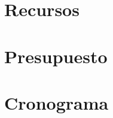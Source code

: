 \section{Recursos}
%
\mbox{}
\newpage%
\mbox{}
\newpage%
\mbox{}
\newpage%
\mbox{}
\newpage%
\section{Presupuesto}
%
\mbox{}
\newpage%
%
\mbox{}
\newpage%
%
\section{Cronograma}
%
\mbox{}
\newpage%
\mbox{}
\newpage%
\mbox{}
\newpage%
\mbox{}
\newpage%